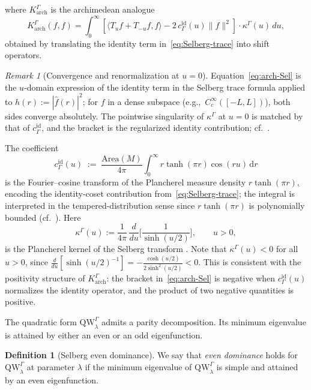 \documentclass[12pt,a4paper]{article}
\theoremstyle{definition}
\newtheorem{definition}[theorem]{Definition}
\theoremstyle{remark}
\newtheorem{remark}[theorem]{Remark}
\newcommand{\QW}{\mathrm{QW}}
\begin{document}
where $K_\mathrm{arch}^\Gamma$ is the archimedean analogue
\begin{equation}
\label{eq:arch-Sel}
K_\mathrm{arch}^\Gamma(f,f) = \int_0^\infty[\langle T_u f + T_{-u}f, f\rangle - 2\,c_\Gamma^{\mathrm{id}}(u)\|f\|^2]\cdot \kappa^\Gamma(u)\,du,
\end{equation}
obtained by translating the identity term in~\eqref{eq:Selberg-trace} into
shift operators.
\begin{remark}[Convergence and renormalization at $u=0$]
\label{rem:arch-renorm}
Equation~\eqref{eq:arch-Sel} is the $u$-domain expression of the identity
term in the Selberg trace formula applied to $h(r) := |\hat f(r)|^2$; for
$f$ in a dense subspace (e.g.,\ $C_c^\infty([-L,L])$), both sides converge
absolutely.  The pointwise singularity of $\kappa^\Gamma$ at $u=0$ is
matched by that of $c_\Gamma^{\mathrm{id}}$, and the bracket is the
regularized identity contribution; cf.\ \cite[Ch.~6]{Hejhal1976}.
\end{remark}
The coefficient
\begin{equation}
\label{eq:cGamma-def}
c_\Gamma^{\mathrm{id}}(u) \;:=\; \frac{\mathrm{Area}(M)}{4\pi}
\int_0^\infty r\tanh(\pi r)\cos(ru)\,\mathrm{d}r
\end{equation}
is the Fourier--cosine transform of the Plancherel measure density
$r\tanh(\pi r)$, encoding the identity-coset contribution from~\eqref{eq:Selberg-trace}; the integral is interpreted in the
tempered-distribution sense since $r\tanh(\pi r)$ is polynomially
bounded (cf.\ \cite[Ch.~6]{Hejhal1976}).  Here
\begin{equation}
\label{eq:kappa-Sel}
\kappa^\Gamma(u) := \frac{1}{4\pi}\,\frac{d}{du}\!\Big[\frac{1}{\sinh(u/2)}\Big],\qquad u > 0,
\end{equation}
is the Plancherel kernel of the Selberg transform \cite[eq.~(1.40)]{Iwaniec2002}.
Note that $\kappa^\Gamma(u) < 0$ for all $u > 0$, since
$\tfrac{d}{du}[\sinh(u/2)^{-1}] = -\tfrac{\cosh(u/2)}{2\sinh^2(u/2)} < 0$.
This is consistent with the positivity structure of $K_\mathrm{arch}^\Gamma$:
the bracket in~\eqref{eq:arch-Sel} is negative when $c_\Gamma^{\mathrm{id}}(u)$ normalizes
the identity operator, and the product of two negative quantities is positive.

The quadratic form $\QW^\Gamma_\lambda$ admits a parity decomposition. Its
minimum eigenvalue is attained by either an even or an odd eigenfunction.

\begin{definition}[Selberg even dominance]
\label{def:Sel-ED}
We say that \emph{even dominance} holds for $\QW^\Gamma_\lambda$ at parameter
$\lambda$ if the minimum eigenvalue of $\QW^\Gamma_\lambda$ is simple and
attained by an even eigenfunction.
\end{definition}
\end{document}
